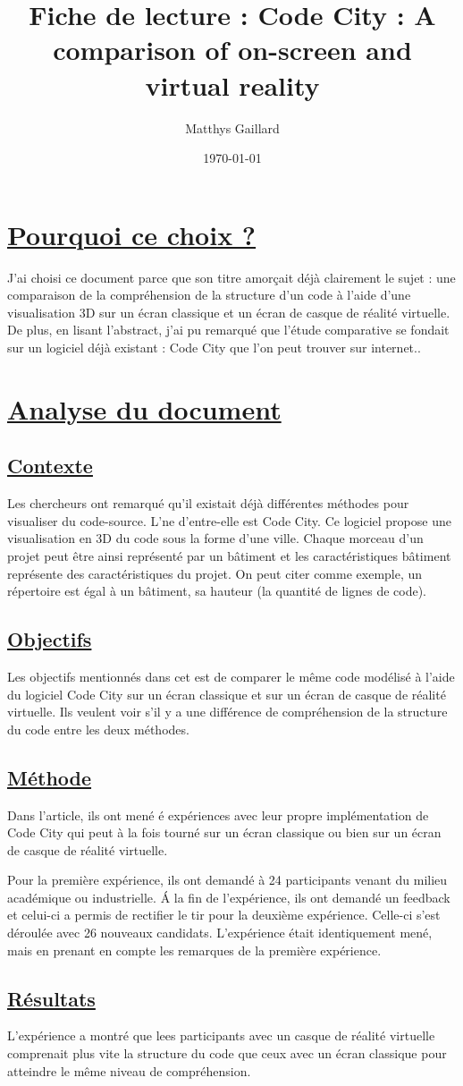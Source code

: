 \documentclass[a4paper,10pt, oneside]{article}
\title{Fiche de lecture : Code City : A comparison of on-screen and virtual reality}
\author{Matthys Gaillard}
\date{\today}
\begin{document}
\maketitle
\section{\ul{Pourquoi ce choix ?}}
		\par J'ai choisi ce document parce que son titre amorçait déjà clairement le sujet\cite{A2} : une comparaison de la compréhension de la 
		structure d'un code à l'aide d'une visualisation 3D sur un écran classique et un écran de casque de réalité virtuelle. De plus, en lisant l'abstract,
		j'ai pu remarqué que l'étude comparative se fondait sur un logiciel déjà existant : Code City que l'on peut trouver sur internet..
\section{\ul{Analyse du document}}
\subsection{\ul{Contexte}}
		\par Les chercheurs ont remarqué qu'il existait déjà différentes méthodes pour visualiser du code-source. L'ne d'entre-elle est Code City. Ce logiciel
		propose une visualisation en 3D du code sous la forme d'une ville. Chaque morceau d'un projet peut être ainsi représenté par un bâtiment et les caractéristiques
		bâtiment représente des caractéristiques du projet. On peut citer comme exemple, un répertoire est égal à un bâtiment, sa hauteur (la quantité de lignes de code).
\subsection{\ul{Objectifs}}
		\par Les objectifs mentionnés dans cet est de comparer le même code modélisé à l'aide du logiciel Code City sur un écran classique et sur un écran de casque de réalité virtuelle.
		Ils veulent voir s'il y a une différence de compréhension de la structure du code entre les deux méthodes.
\subsection{\ul{Méthode}}
		\par Dans l'article, ils ont mené é expériences avec leur propre implémentation de Code City qui peut à la fois tourné sur un écran classique ou bien sur un écran de casque de réalité virtuelle.
		\par Pour la première expérience, ils ont demandé à 24 participants venant du milieu académique ou industrielle. Á la fin de l'expérience, ils ont demandé un feedback et celui-ci a permis de rectifier le tir 
		pour la deuxième expérience. Celle-ci s'est déroulée avec 26 nouveaux candidats. L'expérience était identiquement mené, mais en prenant en compte les remarques de la première expérience.
\subsection{\ul{Résultats}}
		\par L'expérience a montré que lees participants avec un casque de réalité virtuelle comprenait plus vite la structure du code que ceux avec un écran classique pour atteindre le même niveau de compréhension.
\newpage

 
\end{document}
